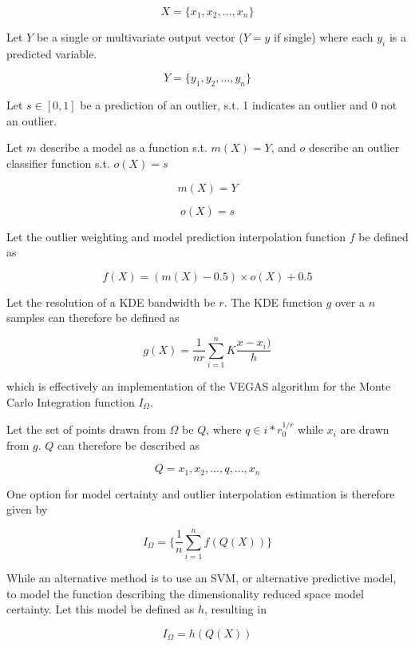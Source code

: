 \documentclass[a4paperpaper,twocolumn]{article}
\begin{document}
$$X = \{x_1, x_2, \ldots, x_n\}$$

Let $Y$ be a single or multivariate output vector ($Y = y$ if single) where each $y_i$ is a predicted variable.

$$Y = \{y_1, y_2, \ldots, y_n\}$$

Let $s \in [0, 1]$ be a prediction of an outlier, s.t. 1 indicates an outlier and 0 not an outlier.

Let $m$ describe a model as a function s.t. $m(X) = Y$, and $o$ describe an outlier classifier function s.t. $o(X) = s$

$$m(X) = Y$$

$$o(X) = s$$

Let the outlier weighting and model prediction interpolation function $f$ be defined as

$$f(X) = (m(X) - 0.5) \times o(X) + 0.5$$

Let the resolution of a KDE bandwidth be $r$. The KDE function $g$ over a $n$ samples can therefore be defined as

$$g(X) = \frac{1}{nr} \sum^n_{i=1} K \frac{x - x_i)}{h}$$

which is effectively an implementation of the VEGAS algorithm for the Monte Carlo Integration function $I_\Omega$.

Let the set of points drawn from $\Omega$ be $Q$, where $q \in {i*r}^{1/r}_0$ while $x_i$ are drawn from $g$. $Q$ can therefore be described as

$$Q = {x_1, x_2, \ldots, q, \ldots, x_n}$$

One option for model certainty and outlier interpolation estimation is therefore given by

$$I_\Omega = \{\frac{1}{n} \sum^n_{i=1} f(Q(X))\}$$

While an alternative method is to use an SVM, or alternative predictive model, to model the function describing the dimensionality reduced space model certainty. Let this model be defined as $h$, resulting in

$$I_\Omega = h(Q(X))$$



\end{document}
